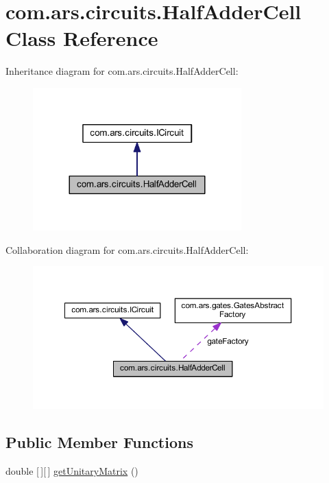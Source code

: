 \hypertarget{classcom_1_1ars_1_1circuits_1_1_half_adder_cell}{}\section{com.\+ars.\+circuits.\+Half\+Adder\+Cell Class Reference}
\label{classcom_1_1ars_1_1circuits_1_1_half_adder_cell}


Inheritance diagram for com.\+ars.\+circuits.\+Half\+Adder\+Cell\+:
\nopagebreak
\begin{figure}[H]
\begin{center}
\leavevmode
\includegraphics[width=228pt]{classcom_1_1ars_1_1circuits_1_1_half_adder_cell__inherit__graph}
\end{center}
\end{figure}


Collaboration diagram for com.\+ars.\+circuits.\+Half\+Adder\+Cell\+:
\nopagebreak
\begin{figure}[H]
\begin{center}
\leavevmode
\includegraphics[width=350pt]{classcom_1_1ars_1_1circuits_1_1_half_adder_cell__coll__graph}
\end{center}
\end{figure}
\subsection*{Public Member Functions}
\begin{DoxyCompactItemize}
\item 
double \mbox{[}$\,$\mbox{]}\mbox{[}$\,$\mbox{]} \hyperlink{classcom_1_1ars_1_1circuits_1_1_half_adder_cell_a540342262612af85393e1c07675fd7e9}{get\+Unitary\+Matrix} ()
\end{DoxyCompactItemize}
